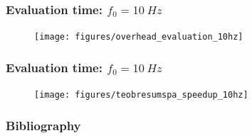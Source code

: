 \documentclass{beamer}
\begin{document}
\begin{frame}
    \frametitle{Evaluation time: \(f_0 = \SI{10}{Hz}\)}
    
    \begin{figure}[ht]
    \centering
    \texttt{[image: figures/overhead\_evaluation\_10hz]}
    \label{fig:overhead_evaluation}
    \end{figure}
\end{frame}

\begin{frame}
    \frametitle{Evaluation time: \(f_0 = \SI{10}{Hz}\)}
    
    \begin{figure}[ht]
    \centering
    \texttt{[image: figures/teobresumspa\_speedup\_10hz]}
    \label{fig:teobresumspa_speedup}
    \end{figure}
\end{frame}

\begin{frame}
    \frametitle{}
    
\end{frame}


\begin{frame}
    \frametitle{Bibliography}
    \printbibliography
\end{frame}
\end{document}
